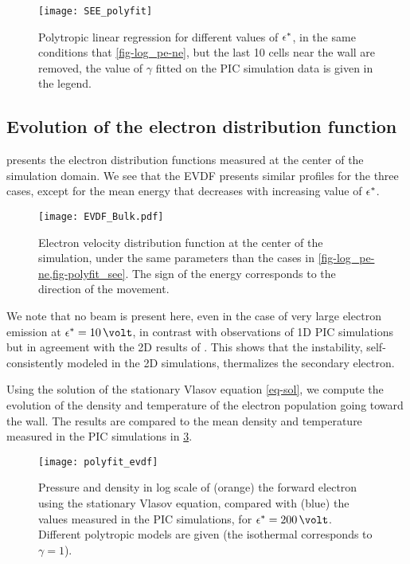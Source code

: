 \renewcommand\subfigurewidth{3in}

\begin{figure}[hbtp]
  \centering
  \texttt{[image: SEE\_polyfit]}
  \caption{Polytropic linear regression for different values of $\epsilon^{*}$, in the same conditions that \cref{fig-log_pe-ne}, but the last 10 cells near the wall are removed, the value of $\gamma$ fitted on the \ac{PIC} simulation data is given in the legend.}
  \label{fig-polyfit_see}
\end{figure}


\subsection{Evolution of the electron distribution function} \label{subsec-EVDF_see_polyfit}

 presents the electron distribution functions measured at the center of the simulation domain. 
We see that the \ac{EVDF} presents similar profiles for the three cases, except for the mean energy that decreases with increasing value of $\epsilon^{*}$.

\begin{figure}[hbtp]
  \centering
  \texttt{[image: EVDF\_Bulk.pdf]}
  \caption{Electron velocity distribution function at the center of the simulation, under the same parameters than the cases in \cref{fig-log_pe-ne,fig-polyfit_see}. The sign of the energy corresponds to the direction of the movement.}
  \label{fig-evdf_epsstar}
\end{figure}


We note that no beam is present here, even in the case of very large electron emission at $\crover=10\,\volt$, in contrast with observations of \ac{1D} PIC simulations \citep{sydorenko2006b,sydorenko2007} but in agreement with the \ac{2D} results of \citet{heron2013}.
This shows that the instability, self-consistently modeled in the \ac{2D} simulations, thermalizes the secondary electron.

Using the solution of the stationary Vlasov equation \cref{eq-sol}, we compute the evolution of the density and temperature of the electron population going toward the wall.
The results are compared to the mean density and temperature measured in the \ac{PIC} simulations in \cref{fig-evdf_polyfit}.

\begin{figure}[hbtp]
  \centering
  \texttt{[image: polyfit\_evdf]}
  \caption{Pressure and density in log scale of (orange) the forward electron using the stationary Vlasov equation, compared with (blue) the values measured in the \ac{PIC} simulations, for $\crover=200\,\volt$. Different polytropic models are given (the isothermal corresponds to $\gamma=1$).}
  \label{fig-evdf_polyfit}
\end{figure}

